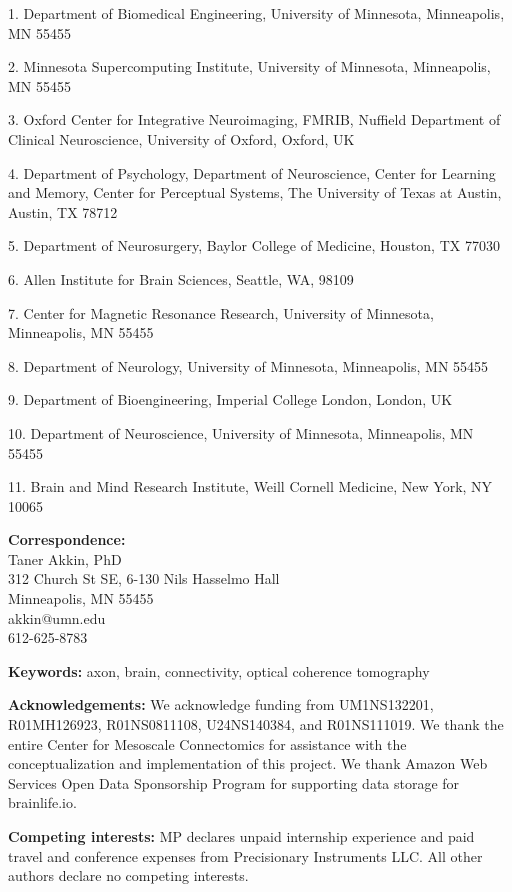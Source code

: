 \documentclass{article}
\begin{document}
\begin{hangpars}
1. Department of Biomedical Engineering, University of Minnesota, Minneapolis, MN 55455

2. Minnesota Supercomputing Institute, University of Minnesota, Minneapolis, MN 55455

3. Oxford Center for Integrative Neuroimaging, FMRIB, Nuffield Department of Clinical Neuroscience, University of Oxford, Oxford, UK

4. Department of Psychology, Department of Neuroscience, Center for Learning and Memory, Center for Perceptual Systems, The University of Texas at Austin, Austin, TX 78712

5. Department of Neurosurgery, Baylor College of Medicine, Houston, TX 77030

6. Allen Institute for Brain Sciences, Seattle, WA, 98109

7. Center for Magnetic Resonance Research, University of Minnesota, Minneapolis, MN 55455

8. Department of Neurology, University of Minnesota, Minneapolis, MN 55455

9. Department of Bioengineering, Imperial College London, London, UK

10. Department of Neuroscience, University of Minnesota, Minneapolis, MN 55455

11. Brain and Mind Research Institute, Weill Cornell Medicine, New York, NY 10065

\end{hangpars}
\noindent \textbf{Correspondence:}\\
Taner Akkin, PhD\\
312 Church St SE, 6-130 Nils Hasselmo Hall\\
Minneapolis, MN 55455\\
akkin@umn.edu\\
612-625-8783

\textbf{Keywords:} axon, brain, connectivity, optical coherence tomography

\textbf{Acknowledgements:} We acknowledge funding from UM1NS132201, R01MH126923, R01NS0811108, U24NS140384, and R01NS111019. We thank the entire Center for Mesoscale Connectomics for assistance with the conceptualization and implementation of this project. We thank Amazon Web Services Open Data Sponsorship Program for supporting data storage for brainlife.io.

\textbf{Competing interests:} MP declares unpaid internship experience and paid travel and conference expenses from Precisionary Instruments LLC. All other authors declare no competing interests.
\end{document}
